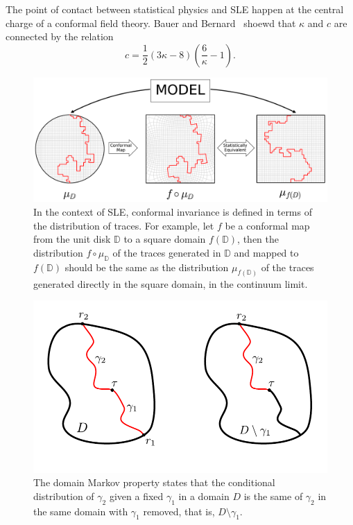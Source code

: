 The point of contact between statistical physics and SLE happen at the
central charge of a conformal field theory. Bauer and Bernard~\cite{Bauer2002}
shoewd that $\kappa$ and $c$ are connected by the relation
\begin{equation}
    c=\frac{1}{2}\left(3\kappa-8\right)\left(\frac{6}{\kappa}-1\right).
\end{equation}


\begin{figure}
\begin{center}
    \includegraphics[width=\textwidth]{chapters/ch4-sle/figs/sle_confinv}
\end{center}
\caption{In the context of SLE, conformal invariance is defined in terms of the
    distribution of traces. For example, let $f$ be a conformal map from the
    unit disk $\mathbb{D}$ to a square domain $f(\mathbb{D})$, then the
    distribution $f\circ\mu_\mathbb{D}$ of the traces generated in $\mathbb{D}$
    and mapped to $f(\mathbb{D})$ should be the same as the distribution
    $\mu_{f(\mathbb{D})}$ of the traces generated directly in the square
    domain, in the continuum limit.}
\label{fig:confinv}
\end{figure}

\begin{figure}
\begin{center}
    \includegraphics[scale=0.9]{chapters/ch4-sle/figs/dmp}
\end{center}
\caption{The domain Markov property states that the conditional distribution of
    $\gamma_2$ given a fixed $\gamma_1$ in a domain $D$ is the same of $\gamma_2$
    in the same domain with $\gamma_1$ removed, that is, $D\setminus\gamma_1$.}
\label{fig:dmp}
\end{figure}


